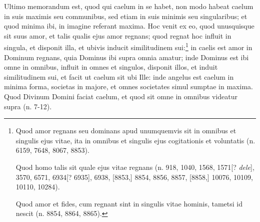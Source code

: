 \begin{topic}{58}
    Ultimo memorandum est, quod qui caelum in se habet, non modo habeat caelum in suis maximis seu communibus, sed etiam
    in suis minimis seu singularibus; et quod minima ibi, in imagine referant maxima.
    Hoc venit ex eo, quod unusquisque sit suus amor, et talis qualis ejus amor regnans; quod regnat hoc influit in
    singula, et disponit illa, et ubivis inducit similitudinem sui:\footnote{Quod amor regnans seu dominans apud
    unumquemvis sit in omnibus et singulis ejus vitae, ita in omnibus et singulis ejus cogitationis et voluntatis (n.
    6159, 7648, 8067, 8853).

    Quod homo talis sit quale ejus vitae regnans (n. 918, 1040, 1568, 1571[? \emph{dele}], 3570, 6571, 6934[? 6935],
    6938, [8853,] 8854, 8856, 8857, [8858,] 10076, 10109, 10110, 10284).

    Quod amor et fides, cum regnant sint in singulis vitae hominis, tametsi id nescit (n. 8854, 8864, 8865).} in caelis
    est amor in Dominum regnans, quia Dominus ibi supra omnia amatur; inde Dominus est ibi omne in omnibus, influit in
    omnes et singulos, disponit illos, et induit similitudinem sui, et facit ut caelum sit ubi Ille: inde angelus est
    caelum in minima forma, societas in majore, et omnes societates simul sumptae in maxima.
    Quod Divinum Domini faciat caelum, et quod sit omne in omnibus videatur supra (n. 7-12).
\end{topic}
